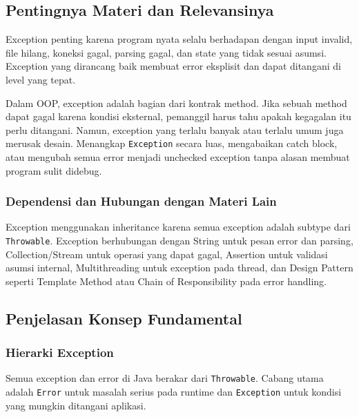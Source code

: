 \subsection{Pentingnya Materi dan Relevansinya}

\begin{jawab}
Exception penting karena program nyata selalu berhadapan dengan input invalid, file hilang, koneksi gagal, parsing gagal, dan state yang tidak sesuai asumsi. Exception yang dirancang baik membuat error eksplisit dan dapat ditangani di level yang tepat.
\end{jawab}

Dalam OOP, exception adalah bagian dari kontrak method. Jika sebuah method dapat gagal karena kondisi eksternal, pemanggil harus tahu apakah kegagalan itu perlu ditangani. Namun, exception yang terlalu banyak atau terlalu umum juga merusak desain. Menangkap \texttt{Exception} secara luas, mengabaikan catch block, atau mengubah semua error menjadi unchecked exception tanpa alasan membuat program sulit didebug.

\subsubsection{Dependensi dan Hubungan dengan Materi Lain}

Exception menggunakan inheritance karena semua exception adalah subtype dari \texttt{Throwable}. Exception berhubungan dengan String untuk pesan error dan parsing, Collection/Stream untuk operasi yang dapat gagal, Assertion untuk validasi asumsi internal, Multithreading untuk exception pada thread, dan Design Pattern seperti Template Method atau Chain of Responsibility pada error handling.

\subsection{Penjelasan Konsep Fundamental}

\subsubsection{Hierarki Exception}

\begin{jawab}
Semua exception dan error di Java berakar dari \texttt{Throwable}. Cabang utama adalah \texttt{Error} untuk masalah serius pada runtime dan \texttt{Exception} untuk kondisi yang mungkin ditangani aplikasi.
\end{jawab}

